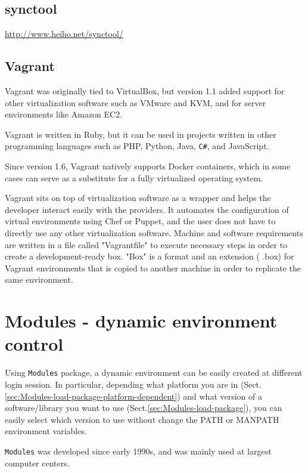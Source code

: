 \subsection{synctool}

\url{http://www.heiho.net/synctool/}


\subsection{Vagrant}
\label{sec:Vagrant}

Vagrant was originally tied to VirtualBox, but version 1.1 added support for
other virtualization software such as VMware and KVM, and for server
environments like Amazon EC2.

Vagrant is written in Ruby, but it can be used in projects written in other
programming languages such as PHP, Python, Java, \verb!C#!, and JavaScript.

Since version 1.6, Vagrant natively supports Docker containers, which in some
cases can serve as a substitute for a fully virtualized operating system.

Vagrant sits on top of virtualization software as a wrapper and helps the
developer interact easily with the providers. It automates the configuration of
virtual environments using Chef or Puppet, and the user does not have to
directly use any other virtualization software. Machine and software
requirements are written in a file called "Vagrantfile" to execute necessary
steps in order to create a development-ready box. "Box" is a format and an
extension ( .box) for Vagrant environments that is copied to another machine in
order to replicate the same environment.




\section{Modules - dynamic environment control}
\label{sec:modules}

Using \verb!Modules! package, a dynamic environment can be easily created at
different login session. In particular, depending what platform you are in
(Sect.\ref{sec:Modules-load-package-platform-dependent}) and what version of a
software/library you want to use (Sect.\ref{sec:Modules-load-package}), you can
easily select which version to use without change the PATH or MANPATH
environment variables.

\verb!Modules! was developed since early 1990s, and was mainly used at largest
computer centers. 

